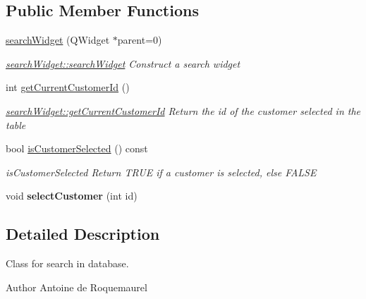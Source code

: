 \subsection*{Public Member Functions}
\begin{DoxyCompactItemize}
\item 
\hyperlink{classsearchWidget_a0c712bf4f3c2105319645ce97e23eba9}{search\+Widget} (Q\+Widget $\ast$parent=0)
\begin{DoxyCompactList}\small\item\em \hyperlink{classsearchWidget_a0c712bf4f3c2105319645ce97e23eba9}{search\+Widget\+::search\+Widget} Construct a search widget \end{DoxyCompactList}\item 
int \hyperlink{classsearchWidget_ac74ae97eb8c147c89edc3dec3decf174}{get\+Current\+Customer\+Id} ()
\begin{DoxyCompactList}\small\item\em \hyperlink{classsearchWidget_ac74ae97eb8c147c89edc3dec3decf174}{search\+Widget\+::get\+Current\+Customer\+Id} Return the id of the customer selected in the table \end{DoxyCompactList}\item 
bool \hyperlink{classsearchWidget_ad69a78f1c657b026a149cdf61fd58f5e}{is\+Customer\+Selected} () const 
\begin{DoxyCompactList}\small\item\em is\+Customer\+Selected Return T\+R\+U\+E if a customer is selected, else F\+A\+L\+S\+E \end{DoxyCompactList}\item 
\hypertarget{classsearchWidget_a88ccf6c445c0d4b2fbeb931e403669fd}{void {\bfseries select\+Customer} (int id)}\label{classsearchWidget_a88ccf6c445c0d4b2fbeb931e403669fd}

\end{DoxyCompactItemize}


\subsection{Detailed Description}
Class for search in database. 

\begin{DoxyAuthor}{Author}
Antoine de Roquemaurel 
\end{DoxyAuthor}



